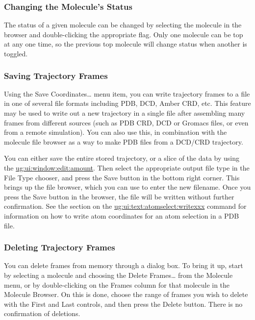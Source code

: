 \subsubsection{Changing the Molecule's Status}

The status of a given molecule can be changed by selecting the molecule in
the browser and double-clicking the appropriate flag. Only one molecule can
be top at any one time, so the previous top molecule will change status when
another is toggled.

\subsubsection{Saving Trajectory Frames}
\label{ug:ui:window:edit:write}

Using the {\sf Save Coordinates\ldots} menu item, you can write trajectory frames to 
a file in one of several file formats including PDB, DCD, Amber CRD, etc.
This feature may be used to write out a new trajectory in a single file 
after assembling many frames from different sources 
(such as PDB CRD, DCD or Gromacs files, or even from a remote
simulation).  You can also use this, in combination with the 
molecule file browser as a way to make PDB files from a DCD/CRD trajectory.

You can either save the entire stored trajectory, or a slice of
the data by using the
\hyperref{{\sf Amount} chooser}{{\sf Amount} chooser [\S~}{]}{ug:ui:window:edit:amount}.
Then select the appropriate output file type in the {\sf File Type}
chooser, and press the {\sf Save} button in the bottom right corner.
This brings up the file browser, which you can use to enter the new
filename.  Once you press the {\sf Save}
button in the browser, the file will be written without further
confirmation. See the section on the
\hyperref{\tt atomselect writexxx}{{\tt atomselect writexxx} [\S~}{]}{ug:ui:text:atomselect:writexxx}
command for information on how to write atom coordinates for an atom selection
in a PDB file.

\subsubsection{Deleting Trajectory Frames}
\label{ug:ui:window:main:delete:frames}

You can delete frames from memory through a dialog box. To bring it up, start by
 selecting a molecule and choosing the 
{\sf Delete Frames\ldots} from the {\sf Molecule} menu, or by double-clicking 
on the {\sf Frames} column for that molecule in the Molecule Browser.
On this is done, choose the
range of frames you wish to delete with the {\sf First} and {\sf Last} controls, 
and then press the {\sf Delete} button.  There is
no confirmation of deletions.

